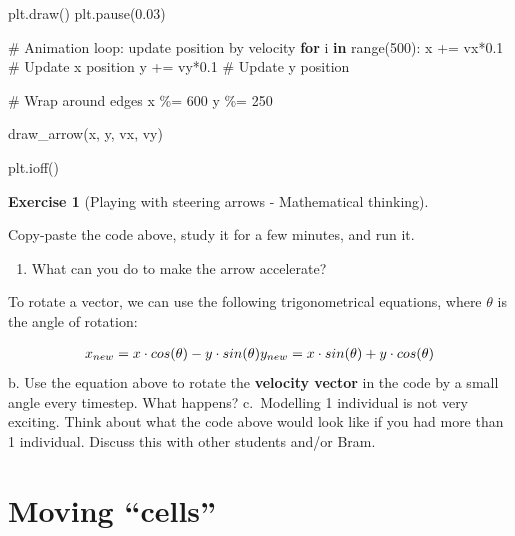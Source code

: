 \documentclass[
  letterpaper,
  DIV=11,
  numbers=noendperiod]{scrreprt}
\newenvironment{Shaded}{\begin{snugshade}}{\end{snugshade}}
\newcommand{\BuiltInTok}[1]{\textcolor[rgb]{0.00,0.23,0.31}{#1}}
\newcommand{\CommentTok}[1]{\textcolor[rgb]{0.37,0.37,0.37}{#1}}
\newcommand{\ControlFlowTok}[1]{\textcolor[rgb]{0.00,0.23,0.31}{\textbf{#1}}}
\newcommand{\DecValTok}[1]{\textcolor[rgb]{0.68,0.00,0.00}{#1}}
\newcommand{\FloatTok}[1]{\textcolor[rgb]{0.68,0.00,0.00}{#1}}
\newcommand{\KeywordTok}[1]{\textcolor[rgb]{0.00,0.23,0.31}{\textbf{#1}}}
\newcommand{\NormalTok}[1]{\textcolor[rgb]{0.00,0.23,0.31}{#1}}
\newcommand{\OperatorTok}[1]{\textcolor[rgb]{0.37,0.37,0.37}{#1}}
\providecommand{\tightlist}{%
  \setlength{\itemsep}{0pt}\setlength{\parskip}{0pt}}\usepackage{longtable,booktabs,array}
\theoremstyle{definition}
\newtheorem{exercise}{Exercise}[chapter]
\theoremstyle{remark}
\begin{document}
\begin{tcolorbox}
\begin{Shaded}
\begin{Highlighting}[]
\NormalTok{    plt.draw()}
\NormalTok{    plt.pause(}\FloatTok{0.03}\NormalTok{)}

\CommentTok{\# Animation loop: update position by velocity}
\ControlFlowTok{for}\NormalTok{ i }\KeywordTok{in} \BuiltInTok{range}\NormalTok{(}\DecValTok{500}\NormalTok{):}
\NormalTok{    x }\OperatorTok{+=}\NormalTok{ vx}\OperatorTok{*}\FloatTok{0.1}  \CommentTok{\# Update x position}
\NormalTok{    y }\OperatorTok{+=}\NormalTok{ vy}\OperatorTok{*}\FloatTok{0.1}  \CommentTok{\# Update y position}

    \CommentTok{\# Wrap around edges}
\NormalTok{    x }\OperatorTok{\%=} \DecValTok{600}
\NormalTok{    y }\OperatorTok{\%=} \DecValTok{250}
    
\NormalTok{    draw\_arrow(x, y, vx, vy)}

\NormalTok{plt.ioff()}
\end{Highlighting}
\end{Shaded}

\end{tcolorbox}

\begin{exercise}[Playing with steering arrows - Mathematical
thinking]\protect\hypertarget{exr-steering}{}\label{exr-steering}

Copy-paste the code above, study it for a few minutes, and run it.

\begin{enumerate}
\def\labelenumi{\alph{enumi}.}
\tightlist
\item
  What can you do to make the arrow accelerate?
\end{enumerate}

To rotate a vector, we can use the following trigonometrical equations,
where \(\theta\) is the angle of rotation:

\[
\begin{aligned}
x_{new} = x \cdot cos(\theta) - y \cdot sin(\theta) \newline
y_{new} = x \cdot sin(\theta) + y \cdot cos(\theta)
\end{aligned}
\] b. Use the equation above to rotate the \textbf{velocity vector} in
the code by a small angle every timestep. What happens? c.~Modelling 1
individual is not very exciting. Think about what the code above would
look like if you had more than 1 individual. Discuss this with other
students and/or Bram.

\end{exercise}

\section*{Moving ``cells''}\label{moving-cells}
\end{document}
